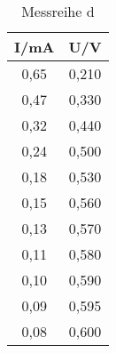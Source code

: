 

\begin{table}[h!]
  \centering
  \caption{Messreihe d}
  \label{tab:Sin}
  \begin{tabular}{c c }
    \toprule
     I/mA &	 U/V	   \\
    \midrule
  0,65  &   0,210\\
  0,47  &   0,330\\
  0,32  &   0,440\\
  0,24  &   0,500\\
  0,18  &   0,530\\
  0,15  &   0,560\\
  0,13  &   0,570\\
  0,11  &   0,580\\
  0,10  &   0,590\\
  0,09  &   0,595\\
  0,08  &   0,600\\


    \bottomrule
  \end{tabular}
\end{table}
